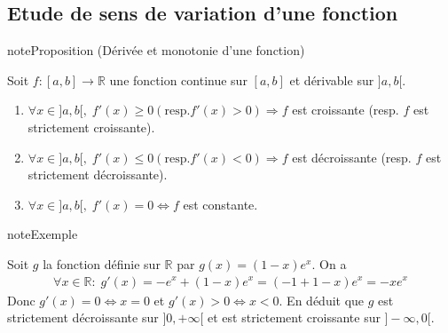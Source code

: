 \documentclass[letterpaper,10pt,french]{jupyterBook}
\begin{document}
\subsection{Etude de sens de variation d’une fonction}
\label{\detokenize{dirivfs:etude-de-sens-de-variation-d-une-fonction}}
\begin{sphinxadmonition}{note}{Proposition (Dérivée et monotonie d’une fonction)}

\sphinxAtStartPar
Soit \(f:[a,b]\rightarrow\mathbb{R}\) une fonction continue sur \([a,b]\) et dérivable sur \(]a,b[.\)
\begin{enumerate}
%
\item {} 
\sphinxAtStartPar
\(\forall x\in ]a,b[,\;f'(x)\geq 0 (\mbox{resp.}f'(x)>0)\Rightarrow f\) est croissante (resp. \(f\) est strictement croissante).

\item {} 
\sphinxAtStartPar
\(\forall x\in ]a,b[,\;f'(x)\leq 0 (\mbox{resp.}f'(x)<0)\Rightarrow f\) est décroissante (resp. \(f\) est strictement décroissante).

\item {} 
\sphinxAtStartPar
\(\forall x\in ]a,b[,\;f'(x)=0\Leftrightarrow f\) est constante.

\end{enumerate}
\end{sphinxadmonition}

\begin{sphinxadmonition}{note}{Exemple}

\sphinxAtStartPar
Soit \(g\) la fonction définie sur \(\mathbb{R}\) par \(g(x)=(1-x)e^x.\) On a
\begin{equation*}
\begin{split}
\forall x\in \mathbb{R}:\;g'(x)=-e^x+(1-x)e^x=(-1+1-x)e^x=-xe^x
\end{split}
\end{equation*}
\sphinxAtStartPar
Donc \(g'(x)=0\Leftrightarrow x=0\) et \(g'(x)>0\Leftrightarrow x<0.\) En déduit que \(g\) est strictement décroissante sur \(]0,+\infty[\) et est strictement croissante sur \(]-\infty,0[.\)
\end{sphinxadmonition}
\end{document}
